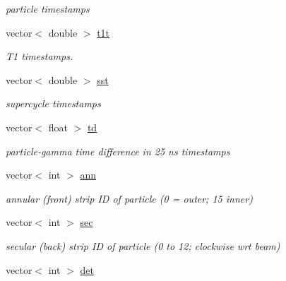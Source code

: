 \begin{DoxyCompactItemize}
\begin{DoxyCompactList}\small\item\em particle timestamps \end{DoxyCompactList}\item 
\hypertarget{classg__clx_aea439e35fbca594eb8124b7e81f97fb7}{vector$<$ double $>$ \hyperlink{classg__clx_aea439e35fbca594eb8124b7e81f97fb7}{t1t}}\label{classg__clx_aea439e35fbca594eb8124b7e81f97fb7}

\begin{DoxyCompactList}\small\item\em T1 timestamps. \end{DoxyCompactList}\item 
\hypertarget{classg__clx_a98fc719d6f94e8f1ccecb4978972699d}{vector$<$ double $>$ \hyperlink{classg__clx_a98fc719d6f94e8f1ccecb4978972699d}{sst}}\label{classg__clx_a98fc719d6f94e8f1ccecb4978972699d}

\begin{DoxyCompactList}\small\item\em supercycle timestamps \end{DoxyCompactList}\item 
\hypertarget{classg__clx_a2adb67934c7e26d01a5faa8ccb6c9c15}{vector$<$ float $>$ \hyperlink{classg__clx_a2adb67934c7e26d01a5faa8ccb6c9c15}{td}}\label{classg__clx_a2adb67934c7e26d01a5faa8ccb6c9c15}

\begin{DoxyCompactList}\small\item\em particle-\/gamma time difference in 25 ns timestamps \end{DoxyCompactList}\item 
\hypertarget{classg__clx_ad017e828f9374d881ad4eac9e6ea1818}{vector$<$ int $>$ \hyperlink{classg__clx_ad017e828f9374d881ad4eac9e6ea1818}{ann}}\label{classg__clx_ad017e828f9374d881ad4eac9e6ea1818}

\begin{DoxyCompactList}\small\item\em annular (front) strip I\-D of particle (0 = outer; 15 inner) \end{DoxyCompactList}\item 
\hypertarget{classg__clx_a556dd0017434edf15b8ec9e25437a932}{vector$<$ int $>$ \hyperlink{classg__clx_a556dd0017434edf15b8ec9e25437a932}{sec}}\label{classg__clx_a556dd0017434edf15b8ec9e25437a932}

\begin{DoxyCompactList}\small\item\em secular (back) strip I\-D of particle (0 to 12; clockwise wrt beam) \end{DoxyCompactList}\item 
\hypertarget{classg__clx_af736c71de60d093f141cae033d675387}{vector$<$ int $>$ \hyperlink{classg__clx_af736c71de60d093f141cae033d675387}{det}}\label{classg__clx_af736c71de60d093f141cae033d675387}


\end{DoxyCompactItemize}
